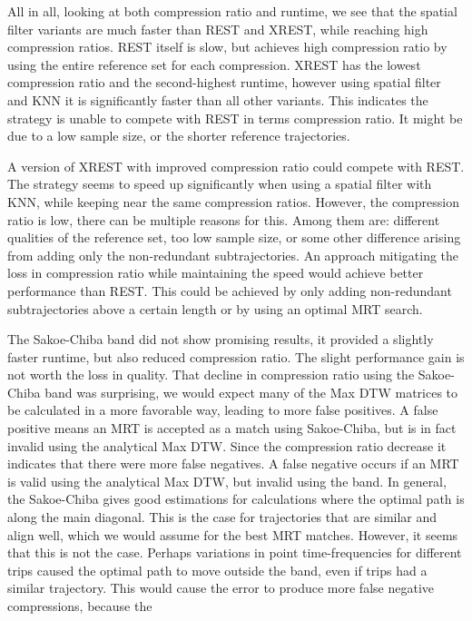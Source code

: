All in all, looking at both compression ratio and runtime, we see that the spatial filter variants are much faster than REST and XREST, while reaching high compression ratios. REST itself is slow, but achieves high compression ratio by using the entire reference set for each compression. XREST has the lowest compression ratio and the second-highest runtime, however using spatial filter and KNN it is significantly faster than all other variants. This indicates the strategy is unable to compete with REST in terms compression ratio. It might be due to a low sample size, or the shorter reference trajectories.

A version of XREST with improved compression ratio could compete with REST. The strategy seems to speed up significantly when using a spatial filter with KNN, while keeping near the same compression ratios. However, the compression ratio is low, there can be multiple reasons for this. Among them are: different qualities of the reference set, too low sample size, or some other difference arising from adding only the non-redundant subtrajectories. An approach mitigating the loss in compression ratio while maintaining the speed would achieve better performance than REST. This could be achieved by only adding non-redundant subtrajectories above a certain length or by using an optimal MRT search.

The Sakoe-Chiba band did not show promising results, it provided a slightly faster runtime, but also reduced compression ratio. The slight performance gain is not worth the loss in quality. That decline in compression ratio using the Sakoe-Chiba band was surprising, we would expect many of the Max DTW matrices to be calculated in a more favorable way, leading to more false positives. A false positive means an MRT is accepted as a match using Sakoe-Chiba, but is in fact invalid using the analytical Max DTW. Since the compression ratio decrease it indicates that there were more false negatives. A false negative occurs if an MRT is valid using the analytical Max DTW, but invalid using the band. In general, the Sakoe-Chiba gives good estimations for calculations where the optimal path is along the main diagonal. This is the case for trajectories that are similar and align well, which we would assume for the best MRT matches. However, it seems that this is not the case. Perhaps variations in point time-frequencies for different trips caused the optimal path to move outside the band, even if trips had a similar trajectory. This would cause the error to produce more false negative compressions, because the

